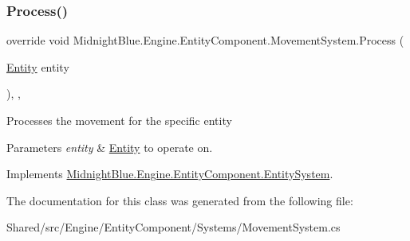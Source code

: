 \subsubsection{\texorpdfstring{Process()}{Process()}}
{\footnotesize\ttfamily override void Midnight\+Blue.\+Engine.\+Entity\+Component.\+Movement\+System.\+Process (\begin{DoxyParamCaption}\item[{\hyperlink{class_midnight_blue_1_1_engine_1_1_entity_component_1_1_entity}{Entity}}]{entity }\end{DoxyParamCaption})\hspace{0.3cm}{\ttfamily [inline]}, {\ttfamily [protected]}, {\ttfamily [virtual]}}



Processes the movement for the specific entity 


\begin{DoxyParams}{Parameters}
{\em entity} & \hyperlink{class_midnight_blue_1_1_engine_1_1_entity_component_1_1_entity}{Entity} to operate on.\\
\hline
\end{DoxyParams}


Implements \hyperlink{class_midnight_blue_1_1_engine_1_1_entity_component_1_1_entity_system_a94aa715ac6bfe9a720c3d12d56c7598c}{Midnight\+Blue.\+Engine.\+Entity\+Component.\+Entity\+System}.



The documentation for this class was generated from the following file\+:\begin{DoxyCompactItemize}
\item 
Shared/src/\+Engine/\+Entity\+Component/\+Systems/Movement\+System.\+cs\end{DoxyCompactItemize}
